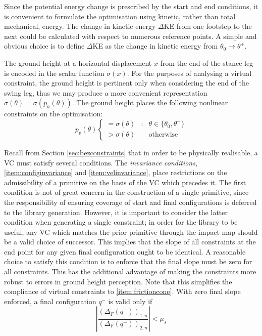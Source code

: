 Since the potential energy change is prescribed by the start and end conditions, it is convenient to formulate the optimisation using kinetic, rather than total mechanical, energy. The change in kinetic energy $\Delta$KE from one footstep to the next could be calculated with respect to numerous reference points. A simple and obvious choice is to define $\Delta$KE as the change in kinetic energy from $\theta_0 \rightarrow \theta^+$.

The ground height at a horizontal displacement $x$ from the end of the stance leg is encoded in the scalar function $\sigma(x)$. For the purposes of analysing a virtual constraint, the ground height is pertinent only when considering the end of the swing leg, thus we may produce a more convenient representation $\sigma(\theta)=\sigma(p_h(\theta))$. The ground height places the following nonlinear constraints on the optimisation:
\begin{equation} \label{eqn:groundheight}
	p_v(\theta) \left\{
	\begin{array}{lcr}
		= \sigma(\theta) &:& \theta \in \{\theta_0, \theta^-\} \\
		> \sigma(\theta) &~& \mathrm{otherwise}
	\end{array} \right.
\end{equation}

Recall from Section \ref{sec:bezconstraints} that in order to be physically realisable, a VC must satisfy several conditions. The \textit{invariance conditions}, \ref{item:configinvariance} and \ref{item:velinvariance}, place restrictions on the admissibility of a primitive on the basis of the VC which precedes it. The first condition is not of great concern in the construction of a single primitive, since the responsibility of ensuring coverage of start and final configurations is deferred to the library generation. However, it is important to consider the latter condition when generating a single constraint; in order for the library to be useful, any VC which matches the prior primitive through the impact map should be a valid choice of successor. This implies that the slope of all constraints at the end point for any given final configuration ought to be identical. A reasonable choice to satisfy this condition is to enforce that the final slope must be zero for all constraints. This has the additional advantage of making the constraints more robust to errors in ground height perception. Note that this simplifies the compliance of virtual constraints to \ref{item:frictioncone}. With zero final slope enforced, a final configuration $q^-$ is valid only if 
\begin{equation} \label{eqn:zeroslopefriccone}
	\left\lvert \frac{(\Delta_F(q^-))_{1,n}}{(\Delta_F(q^-))_{2,n}}\right\rvert < \mu_s
\end{equation}

